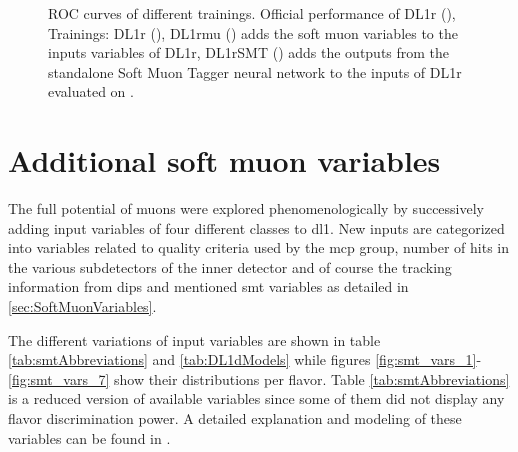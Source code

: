 \begin{figure}[]
  \centering
  \caption{ROC curves of different trainings. Official performance of DL1r (), Trainings: DL1r (), DL1rmu () adds the soft muon variables to the inputs variables of DL1r,  DL1rSMT () adds the outputs from the standalone Soft Muon Tagger neural network to the inputs of DL1r evaluated on \Zprime. }
  \label{fig:DL1rmu_vs_DL1r_SMT_z}
\end{figure}



\section{Additional soft muon variables}
The full potential of muons were explored phenomenologically by successively adding input variables of four different classes to \ac{dl1}. New inputs are categorized into variables related to quality criteria used by the \ac{mcp} group, number of hits in the various subdetectors of the inner detector and of course the tracking information from \ac{dips} and mentioned \ac{smt} variables as detailed in \ref{sec:SoftMuonVariables}. 

The different variations of input variables are shown in table \ref{tab:smtAbbreviations} and \ref{tab:DL1dModels} while figures \ref{fig:smt_vars_1}-\ref{fig:smt_vars_7} show their distributions per flavor. Table \ref{tab:smtAbbreviations} is a reduced version of available variables since some of them did not display any flavor discrimination power. A detailed explanation and modeling of these variables can be found in \citep{Assamagan:1099953,Bugge:2665711}.

